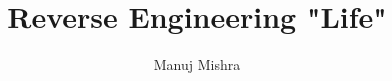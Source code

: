 \documentclass[a4paper, twoside, 11pt]{report}
\title{Reverse Engineering "Life"}
\author{Manuj Mishra}
\begin{document}
\renewcommand{\listtheoremname}{List of Definitions}
\renewcommand{\vec}[1]{\underline{\mathbf{#1}}}
\newcommand{\round}[1]{\ensuremath{\lfloor#1\rceil}}



\begin{abstract}

\end{abstract}

\renewcommand{\abstractname}{Acknowledgements}

\begin{abstract}

\end{abstract}

\tableofcontents
\listoftodos
\listoffigures
\listoftheorems[ignoreall, show={definition}]
\begingroup
\let\clearpage\relax
\listofalgorithms
\endgroup













\end{document}

